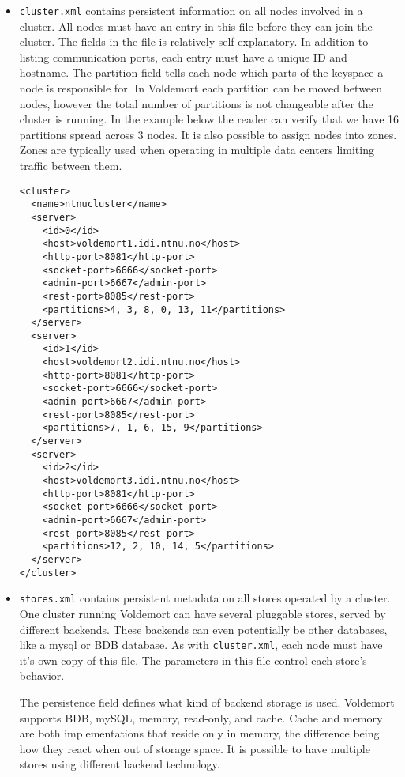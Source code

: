 \begin{itemize}
\item \texttt{cluster.xml} contains persistent information on all nodes involved in a cluster. All nodes must have an entry in this file before they can join the cluster. The fields in the file is relatively self explanatory. In addition to listing communication ports, each entry must have a unique ID and hostname. The partition field tells each node which parts of the keyspace a node is responsible for. In Voldemort each partition can be moved between nodes, however the total number of partitions is not changeable after the cluster is running. In the example below the reader can verify that we have 16 partitions spread across 3 nodes. It is also possible to assign nodes into zones. Zones are typically used when operating in multiple data centers limiting traffic between them. 

\begin{lstlisting}[style=customc, caption=Sample cluster.xml]
<cluster>
  <name>ntnucluster</name>
  <server>
    <id>0</id>
    <host>voldemort1.idi.ntnu.no</host>
    <http-port>8081</http-port>
    <socket-port>6666</socket-port>
    <admin-port>6667</admin-port>
    <rest-port>8085</rest-port>
    <partitions>4, 3, 8, 0, 13, 11</partitions>
  </server>
  <server>
    <id>1</id>
    <host>voldemort2.idi.ntnu.no</host>
    <http-port>8081</http-port>
    <socket-port>6666</socket-port>
    <admin-port>6667</admin-port>
    <rest-port>8085</rest-port>
    <partitions>7, 1, 6, 15, 9</partitions>
  </server>
  <server>
    <id>2</id>
    <host>voldemort3.idi.ntnu.no</host>
    <http-port>8081</http-port>
    <socket-port>6666</socket-port>
    <admin-port>6667</admin-port>
    <rest-port>8085</rest-port>
    <partitions>12, 2, 10, 14, 5</partitions>
  </server>
</cluster>
\end{lstlisting}

\item \texttt{stores.xml} contains persistent metadata on all stores operated by a cluster. One cluster running Voldemort can have several pluggable stores, served by different backends. These backends can even potentially be other databases, like a mysql or BDB database. As with \texttt{cluster.xml}, each node must have it's own copy of this file. The parameters in this file control each store's behavior. 

The persistence field defines what kind of backend storage is used. Voldemort supports BDB, mySQL, memory, read-only, and cache. Cache and memory are both implementations that reside only in memory, the difference being how they react when out of storage space. It is possible to have multiple stores using different backend technology. 


\end{itemize}
